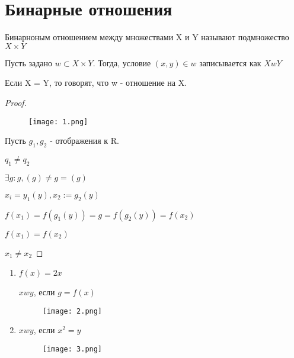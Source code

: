 


\section{Бинарные отношения}



\begin{definition}
    Бинарноным отношением между множествами X и Y называют подмножество $X \times Y$

\end{definition}

\begin{notation}
    Пусть задано $w \subset X \times Y$. Тогда, условие $(x, y) \in w$ записывается как $X w Y$
\end{notation}

\begin{notation}
    Если X = Y, то говорят, что w - отношение на X.
\end{notation}

\begin{proof}
    \begin{figure}[H]
        \centering
        \texttt{[image: 1.png]}
        
        
        \label{fig:1}
    \end{figure}

    Пусть $g_1, g_2$ - отображения к R.

    $q_1 \neq q_2$

    $\exists g : g, (g) \neq g = (g)$

    $x_i = y_1(y), x_2 := g_2(y)$

    $f(x_1) = f(g_1(y)) = g = f(g_2(y)) = f(x_2)$

    $f(x_1) = f(x_2)$

    $x_1 \neq x_2$
\end{proof}

\begin{eg}
    \begin{enumerate}
        \item $f(x) = 2x$
        
        $ x w y$, если $g = f(x)$

        \begin{figure}[H]
            \centering
            \texttt{[image: 2.png]}
            
            
            \label{fig:2}
        \end{figure}

        \item $x w y$, если $x^2 = y$
        
        \begin{figure}[H]
            \centering
            \texttt{[image: 3.png]}
            
            
            \label{fig:3}
        \end{figure}
    \end{enumerate}
\end{eg}

